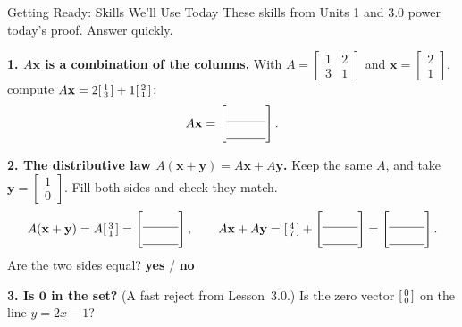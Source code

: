 \documentclass[10pt]{article}
\newcommand{\xx}{\mathbf{x}}
\newcommand{\yy}{\mathbf{y}}
\newcommand{\zero}{\mathbf{0}}
\begin{document}
\namedateperiod

\vspace{0.12in}

\begin{notesbox}{Getting Ready: Skills We'll Use Today}
\small These skills from Units 1 and 3.0 power today's proof. Answer quickly.

\vspace{4pt}
\textbf{1. $A\xx$ is a combination of the columns.} With $A=\begin{bmatrix} 1 & 2 \\ 3 & 1 \end{bmatrix}$
and $\xx=\begin{bmatrix} 2 \\ 1 \end{bmatrix}$, compute $A\xx = 2\begin{bsmallmatrix} 1\\3 \end{bsmallmatrix}+1\begin{bsmallmatrix} 2\\1 \end{bsmallmatrix}$:
\[
  A\xx = \begin{bmatrix}\rule{0pt}{1.1em}\blank{1.1cm}\\[2pt]\blank{1.1cm}\end{bmatrix}.
\]

\vspace{4pt}
\textbf{2. The distributive law $A(\xx+\yy)=A\xx+A\yy$.} Keep the same $A$, and take
$\yy=\begin{bmatrix} 1 \\ 0 \end{bmatrix}$. Fill both sides and check they match.
\[
  A(\xx+\yy)=A\begin{bsmallmatrix} 3\\1 \end{bsmallmatrix}=\begin{bmatrix}\rule{0pt}{1.1em}\blank{1.0cm}\\[2pt]\blank{1.0cm}\end{bmatrix},
  \qquad
  A\xx+A\yy=\begin{bsmallmatrix} 4\\7 \end{bsmallmatrix}+\begin{bmatrix}\rule{0pt}{1.1em}\blank{1.0cm}\\[2pt]\blank{1.0cm}\end{bmatrix}
  =\begin{bmatrix}\rule{0pt}{1.1em}\blank{1.0cm}\\[2pt]\blank{1.0cm}\end{bmatrix}.
\]
Are the two sides equal? \; \textbf{yes} \quad / \quad \textbf{no}

\vspace{4pt}
\textbf{3. Is $\zero$ in the set?} (A fast reject from Lesson~3.0.) Is the zero vector
$\begin{bsmallmatrix} 0\\0 \end{bsmallmatrix}$ on the line $y=2x-1$? \writeline
\end{notesbox}
\end{document}
